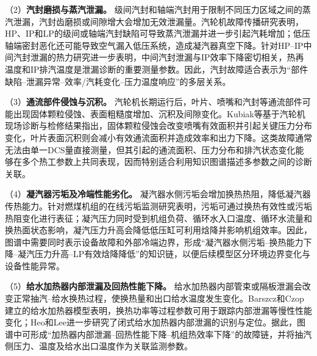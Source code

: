 （2）\textbf{汽封磨损与蒸汽泄漏。} 级间汽封和轴端汽封用于限制不同压力区域之间的蒸汽泄漏，汽封齿磨损或间隙增大会增加无效泄漏量。汽轮机故障传播研究表明，HP、IP和LP的级间或轴端汽封缺陷可导致蒸汽泄漏并进一步引起汽耗增加；低压轴端密封恶化还可能导致空气漏入低压系统，造成凝汽器真空下降\cite{ZhangHu2021FaultPropagationGNN}。针对HP--IP中间汽封泄漏的热力研究进一步表明，中间汽封泄漏与IP效率下降密切相关，热再温度和IP排汽温度是泄漏诊断的重要测量参数\cite{Xu2011HPIPLeakage}。因此，汽封故障适合表示为“部件缺陷--泄漏异常--效率/汽耗变化--压力温度响应”的多层关系。

（3）\textbf{通流部件侵蚀与沉积。} 汽轮机长期运行后，叶片、喷嘴和汽封等通流部件可能出现固体颗粒侵蚀、表面粗糙度增加、沉积及间隙变化。Kubiak等基于汽轮机现场诊断与检修结果指出，固体颗粒侵蚀会改变喷嘴有效面积并引起关键压力分布变化，叶片表面沉积则会减小有效通流面积并造成效率和出力下降\cite{Kubiak2002TurbineDegradation,Kubiak2002ScaleDeposit}。这类故障通常无法由单一DCS量直接测量，但其引起的通流面积、压力分布和排汽状态变化能够在多个热工参数上共同表现，因而特别适合利用知识图谱描述多参数之间的诊断关联。

（4）\textbf{凝汽器污垢及冷端性能劣化。} 凝汽器水侧污垢会增加换热热阻，降低凝汽器传热能力。针对燃煤机组的在线污垢监测研究表明，污垢可通过换热有效性或污垢热阻变化进行表征\cite{Li2016CondenserFouling}；凝汽压力同时受到机组负荷、循环水入口温度、循环水流量和换热面状态影响，凝汽压力升高会降低低压缸可利用焓降并影响机组效率\cite{Medica2018CondenserCondition}。因此，图谱中需要同时表示设备故障和外部冷端边界，形成“凝汽器水侧污垢--换热能力下降--凝汽压力升高--LP有效焓降降低”的知识链，以便后续模型区分环境边界变化与设备性能异常。

（5）\textbf{给水加热器内部泄漏及回热性能下降。} 给水加热器内部管束或隔板泄漏会改变正常抽汽--给水换热过程，使换热量和出口给水温度发生变化。Barszcz和Czop建立的给水加热器模型表明，换热功率等过程参数可用于跟踪内部泄漏等慢性性能变化\cite{Barszcz2011FeedwaterHeater}；Heo和Lee进一步研究了闭式给水加热器内部泄漏的识别与定位\cite{Heo2012FWHLeakage}。据此，图谱中可形成“加热器内部泄漏--回热性能下降--机组热效率下降”的故障链，并将抽汽侧压力、温度及给水出口温度作为关联监测参数。

